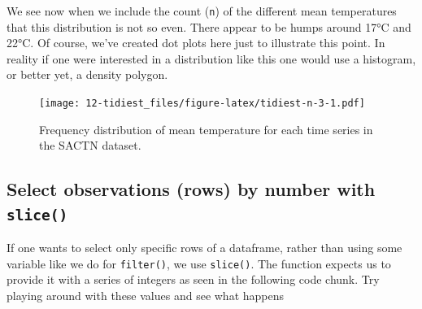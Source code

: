 \documentclass[]{book}
\newenvironment{Shaded}{\begin{snugshade}}{\end{snugshade}}
\newcommand{\KeywordTok}[1]{\textcolor[rgb]{0.13,0.29,0.53}{\textbf{#1}}}
\newcommand{\DataTypeTok}[1]{\textcolor[rgb]{0.13,0.29,0.53}{#1}}
\newcommand{\FloatTok}[1]{\textcolor[rgb]{0.00,0.00,0.81}{#1}}
\newcommand{\StringTok}[1]{\textcolor[rgb]{0.31,0.60,0.02}{#1}}
\newcommand{\OperatorTok}[1]{\textcolor[rgb]{0.81,0.36,0.00}{\textbf{#1}}}
\newcommand{\NormalTok}[1]{#1}
\theoremstyle{definition}
\theoremstyle{definition}
\theoremstyle{definition}
\theoremstyle{remark}
\begin{document}
We see now when we include the count (\texttt{n}) of the different mean
temperatures that this distribution is not so even. There appear to be
humps around 17°C and 22°C. Of course, we've created dot plots here just
to illustrate this point. In reality if one were interested in a
distribution like this one would use a histogram, or better yet, a
density polygon.

\begin{Shaded}
\end{Shaded}

\begin{figure}
\centering
\texttt{[image: 12-tidiest\_files/figure-latex/tidiest-n-3-1.pdf]}
\caption{\label{fig:tidiest-n-3}Frequency distribution of mean temperature
for each time series in the SACTN dataset.}
\end{figure}

\subsection{\texorpdfstring{Select observations (rows) by number with
\texttt{slice()}}{Select observations (rows) by number with slice()}}\label{select-observations-rows-by-number-with-slice}

If one wants to select only specific rows of a dataframe, rather than
using some variable like we do for \texttt{filter()}, we use
\texttt{slice()}. The function expects us to provide it with a series of
integers as seen in the following code chunk. Try playing around with
these values and see what happens
\end{document}
